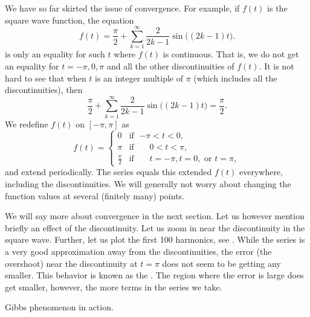 \documentclass{ximera}
\begin{document}
We have so far skirted the issue of convergence.  For example, if $f(t)$ is the square wave function, the equation
\begin{equation*}
    f(t) =  \frac{\pi}{2} + \sum_{k=1}^\infty \frac{2}{2k-1} \sin \bigl( (2k-1) t \bigr) .
\end{equation*}
is only an equality for such $t$ where $f(t)$ is continuous.  That is, we do not get an equality for $t=-\pi,0,\pi$ and all the other discontinuities of $f(t)$.  It is not hard to see that when $t$ is an integer multiple of $\pi$ (which includes all the discontinuities), then
\begin{equation*}
    \frac{\pi}{2} + \sum_{k=1}^\infty \frac{2}{2k-1} \sin \bigl( (2k-1) t \bigr) = \frac{\pi}{2} .
\end{equation*}
We redefine $f(t)$ on $[-\pi,\pi]$ as
\begin{equation*}
    f(t) =
    \begin{cases}
        0 & \text{if } \; {-\pi} < t < 0 , \\
        \pi & \text{if } \; \phantom{-}0 < t < \pi , \\
        \frac{\pi}{2} & \text{if } \; \phantom{-}t = -\pi, t = 0,\text{ or } t = \pi,
    \end{cases}
\end{equation*}
and extend periodically. The series equals this extended $f(t)$ everywhere, including the discontinuities. We will generally not worry about changing the function values at several (finitely many) points.

We will say more about convergence in the next section.  Let us however mention briefly an effect of the discontinuity.  Let us zoom in near the discontinuity in the square wave.  Further, let us plot the first 100 harmonics, see .  While the series is a very good approximation away from the discontinuities, the error (the overshoot) near the discontinuity at $t=\pi$ does not seem to be getting any smaller. This behavior is known as the \emph{}. The region where the error is large does get smaller, however, the more terms in the series we take.

\begin{myfig}
    \capstart
    \caption{Gibbs phenomenon in action.\label{ts:squarewavegibbsfig}}
\end{myfig}
\end{document}
